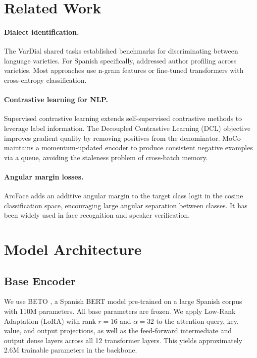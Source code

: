 \documentclass[11pt,a4paper]{article}
\begin{document}
\section{Related Work}

\paragraph{Dialect identification.}
The VarDial shared tasks \citep{zampieri2017findings} established benchmarks
for discriminating between language varieties. For Spanish specifically,
\citet{rangel2016overview} addressed author profiling across varieties.
Most approaches use n-gram features or fine-tuned transformers with
cross-entropy classification.

\paragraph{Contrastive learning for NLP.}
Supervised contrastive learning \citep{khosla2020supervised} extends
self-supervised contrastive methods to leverage label information. The
Decoupled Contrastive Learning (DCL) objective \citep{yeh2022decoupled}
improves gradient quality by removing positives from the denominator.
MoCo \citep{he2020momentum} maintains a momentum-updated encoder to
produce consistent negative examples via a queue, avoiding the staleness
problem of cross-batch memory.

\paragraph{Angular margin losses.}
ArcFace \citep{deng2019arcface} adds an additive angular margin to the target
class logit in the cosine classification space, encouraging large angular
separation between classes. It has been widely used in face recognition and
speaker verification.

\section{Model Architecture}

\subsection{Base Encoder}

We use BETO \citep{canete2020spanish}, a Spanish BERT model pre-trained on a
large Spanish corpus with 110M parameters. All base parameters are frozen. We
apply Low-Rank Adaptation (LoRA) \citep{hu2022lora} with rank $r=16$ and
$\alpha=32$ to the attention query, key, value, and output projections, as well
as the feed-forward intermediate and output dense layers across all 12
transformer layers. This yields approximately 2.6M trainable parameters in the
backbone.
\end{document}
